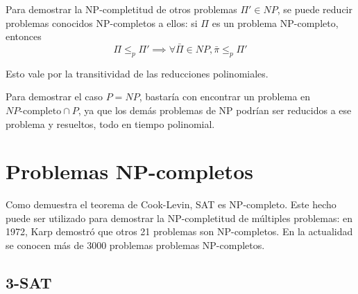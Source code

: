 \documentclass[a4paper]{report}
\begin{document}
Para demostrar la NP-completitud de otros problemas $\Pi' \in NP$, se puede reducir problemas conocidos NP-completos a ellos: si $\Pi$ es un problema NP-completo, entonces
$$\Pi \leq_p \Pi' \implies \forall \bar{\Pi} \in NP, \bar{\pi} \leq_p \Pi'$$

Esto vale por la transitividad de las reducciones polinomiales.

Para demostrar el caso $P = NP$, bastaría con encontrar un problema en $NP\text{-completo} \cap P$, ya que los demás problemas de NP podrían ser reducidos a ese problema y resueltos, todo en tiempo polinomial.

\section{Problemas NP-completos}

Como demuestra el teorema de Cook-Levin, SAT es NP-completo. Este hecho puede ser utilizado para demostrar la NP-completitud de múltiples problemas: en 1972, Karp demostró que otros 21 problemas son NP-completos. En la actualidad se conocen más de 3000 problemas problemas NP-completos.

\subsection{3-SAT}
\label{3-sat}
\end{document}

